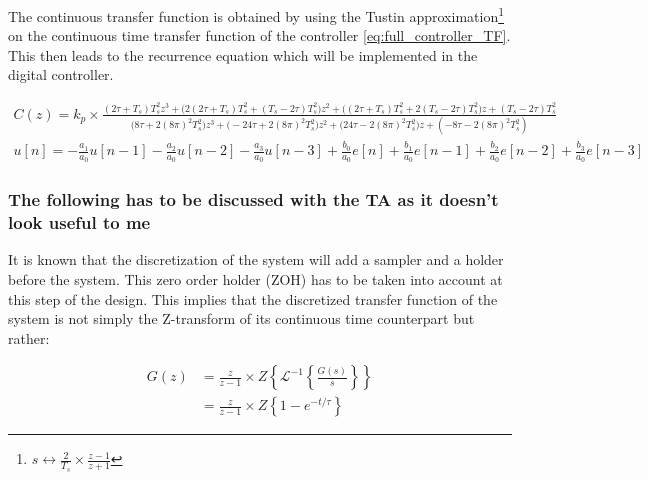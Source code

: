 The continuous transfer function is obtained by using the Tustin approximation\footnote{$s \leftrightarrow \frac{2}{T_s}
\times\frac{z-1}{z+1}$} on the continuous time transfer function of the controller \ref{eq:full_controller_TF}. This 
then leads to the recurrence equation which will be implemented in the digital controller.

\begin{align}
    C(z) = k_p \times \frac{(2\tau + T_s)T_s^2 z^3 + \big(2(2\tau + T_s)T_s^2 + (T_s - 2\tau)T_s^2\big)z^2 + \big(
    (2\tau + T_s) T_s^2 + 2(T_s - 2\tau)T_s^2\big)z + (T_s - 2\tau)T_s^2}{\big(8\tau + 2(8\pi)^2 T_s^2\big)z^3 + \big(
    -24\tau + 2 (8\pi)^2 T_s^2\big)z^2 + \big(24\tau - 2(8\pi)^2 T_s^2\big)z + (-8\tau - 2(8\pi)^2 T_s^2)}\\
    u[n] = -\frac{a_1}{a_0} u[n-1] - \frac{a_2}{a_0} u[n-2] - \frac{a_3}{a_0} u[n-3] + \frac{b_0}{a_0} e[n] + \frac{b_1}
    {a_0} e[n-1] + \frac{b_2}{a_0} e[n-2] + \frac{b_3}{a_0} e[n-3]
\end{align}



\subsubsection{The following has to be discussed with the TA as it doesn't look useful to me}

It is known that the discretization of the system will add a sampler and a holder before the system. This zero order 
holder (ZOH) has to be taken into account at this step of the design. This implies that the discretized transfer 
function of the system is not simply the Z-transform of its continuous time counterpart but rather:

\begin{align}
    G(z) &= \frac{z}{z-1} \times Z \left\{ \mathcal{L}^{-1}\left\{ \frac{G(s)}{s} \right\} \right\}\\
    &= \frac{z}{z-1} \times Z \left\{ 1 - e^{-t/\tau}\right\}
\end{align}

